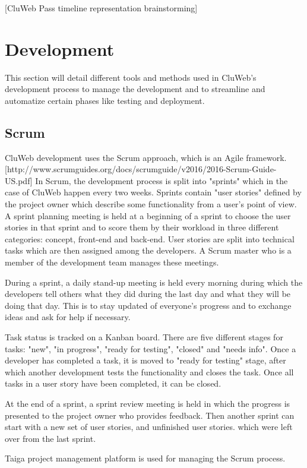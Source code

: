 [CluWeb Pass timeline representation brainstorming]

\section{Development}
This section will detail different tools and methods used in CluWeb's development process to manage the development and to streamline and automatize certain phases like testing and deployment.

\subsection{Scrum}
CluWeb development uses the Scrum approach, which is an Agile framework. [http://www.scrumguides.org/docs/scrumguide/v2016/2016-Scrum-Guide-US.pdf]
In Scrum, the development process is split into "sprints" which in the case of CluWeb happen every two weeks. Sprints contain "user stories" defined by the project owner which describe some functionality from a user's point of view. A sprint planning meeting is held at a beginning of a sprint to choose the user stories in that sprint and to score them by their workload in three different categories: concept, front-end and back-end. User stories are split into technical tasks which are then assigned among the developers. A Scrum master who is a member of the development team manages these meetings.

During a sprint, a daily stand-up meeting is held every morning during which the developers tell others what they did during the last day and what they will be doing that day. This is to stay updated of everyone's progress and to exchange ideas and ask for help if necessary.

Task status is tracked on a Kanban board. There are five different stages for tasks: "new", "in progress", "ready for testing", "closed" and "needs info". Once a developer has completed a task, it is moved to "ready for testing" stage, after which another development tests the functionality and closes the task. Once all tasks in a user story have been completed, it can be closed.

At the end of a sprint, a sprint review meeting is held in which the progress is presented to the project owner who provides feedback. Then another sprint can start with a new set of user stories, and unfinished user stories. which were left over from the last sprint.

Taiga project management platform is used for managing the Scrum process.

